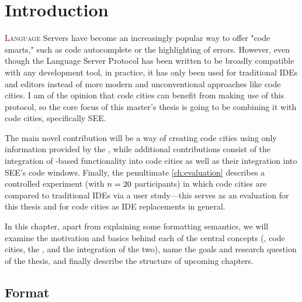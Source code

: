 \documentclass[../thesis]{subfiles}
\begin{document}
\chapter{Introduction}

\lettrine[lines=3]{\textcolor{Maroon}{L}}{anguage} Servers have become an increasingly popular way to offer "code smarts," such as code autocomplete or the highlighting of errors.
However, even though the Language Server Protocol has been written to be broadly compatible with any development tool, in practice, it has only been used for traditional IDEs and editors instead of more modern and unconventional approaches like code cities.
I am of the opinion that code cities can benefit from making use of this protocol, so the core focus of this master's thesis is going to be combining it with code cities, specifically SEE.

The main novel contribution will be a way of creating code cities using only information provided by the , while additional contributions consist of the integration of -based functionality into code cities as well as their integration into SEE's code windows.
Finally, the penultimate \cref{ch:evaluation} describes a controlled experiment (with $n=20$ participants) in which code cities are compared to traditional IDEs via a user study---this serves as an evaluation for this thesis and for code cities as IDE replacements in general.

In this chapter, apart from explaining some formatting semantics, we will examine the motivation and basics behind each of the central concepts (\ie, code cities, the , and the integration of the two), name the goals and research question of the thesis, and finally describe the structure of upcoming chapters.

\section{Format}
\end{document}
